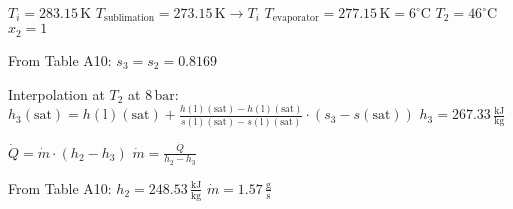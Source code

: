 \( T_i = 283.15 \, \text{K} \)  
\( T_{\text{sublimation}} = 273.15 \, \text{K} \rightarrow T_i \)  
\( T_{\text{evaporator}} = 277.15 \, \text{K} = 6^\circ \text{C} \)  
\( T_2 = 46^\circ \text{C} \)  
\( x_2 = 1 \)  

From Table A10:  
\( s_3 = s_2 = 0.8169 \)  

Interpolation at \( T_2 \) at \( 8 \, \text{bar} \):  
\( h_3 (\text{sat}) = h(\text{l}) (\text{sat}) + \frac{h(\text{l}) (\text{sat}) - h(\text{l}) (\text{sat})}{s(\text{l}) (\text{sat}) - s(\text{l}) (\text{sat})} \cdot (s_3 - s(\text{sat})) \)  
\( h_3 = 267.33 \, \frac{\text{kJ}}{\text{kg}} \)  

\( \dot{Q} = \dot{m} \cdot (h_2 - h_3) \)  
\( \dot{m} = \frac{\dot{Q}}{h_2 - h_3} \)  

From Table A10:  
\( h_2 = 248.53 \, \frac{\text{kJ}}{\text{kg}} \)  
\( \dot{m} = 1.57 \, \frac{\text{g}}{\text{s}} \)